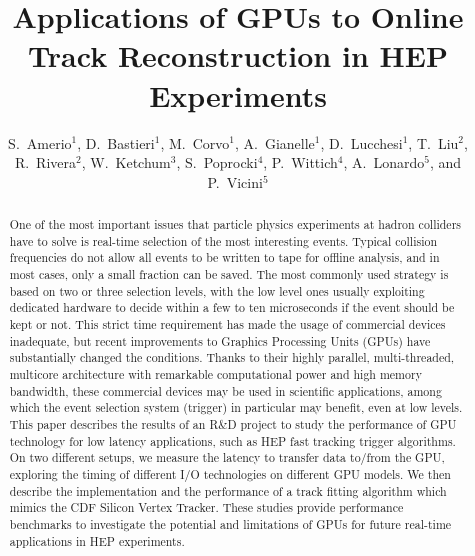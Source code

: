\documentclass[letterpaper]{jpconf}
\begin{document}
\title{Applications of GPUs to Online Track Reconstruction in HEP Experiments}
\author{S.~Amerio$^1$, 
  D.~Bastieri$^1$, 
  M.~Corvo$^1$, 
  A.~Gianelle$^1$, 
  D.~Lucchesi$^1$,
  T.~Liu$^2$, 
  R.~Rivera$^2$, 
  W.~Ketchum$^3$,
  S.~Poprocki$^4$, P.~Wittich$^4$,
  A.~Lonardo$^5$, and P.~Vicini$^5$
}
\address{$^1$ INFN and University of Padova, Italy}
\address{$^2$ Fermi National Accelerator Laboratory, Illinois, USA}
\address{$^3$ Los Alamos National Laboratory, New Mexico, USA}
\address{$^4$ Cornell University, New York, USA}
\address{$^5$ INFN Roma, Italy}


\begin{abstract}
  One of the most important issues that particle physics experiments
  at hadron colliders have to solve is real-time selection of the most
  interesting events. Typical collision frequencies do not allow all
  events to be written to tape for offline analysis, and in most
  cases, only a small fraction can be saved. The most commonly used
  strategy is based on two or three selection levels, with the low
  level ones usually exploiting dedicated hardware to decide within a
  few to ten microseconds if the event should be kept or not. This
  strict time requirement has made the usage of commercial devices
  inadequate, but recent improvements to Graphics Processing Units
  (GPUs) have substantially changed the conditions. Thanks to their
  highly parallel, multi-threaded, multicore architecture with
  remarkable computational power and high memory bandwidth, these
  commercial devices may be used in scientific applications, among
  which the event selection system (trigger) in particular may
  benefit, even at low levels. This paper describes the results of an
  R\&D project to study the performance of GPU technology for low
  latency applications, such as HEP fast tracking trigger algorithms.
  On two different setups, we measure the latency to transfer data
  to/from the GPU, exploring the timing of different I/O technologies
  on different GPU models. We then describe the implementation and the
  performance of a track fitting algorithm which mimics the CDF
  Silicon Vertex Tracker.  These studies provide performance
  benchmarks to investigate the potential and limitations of GPUs for
  future real-time applications in HEP experiments.
\end{abstract}
\end{document}
